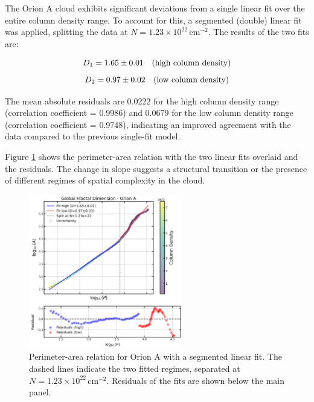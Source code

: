 The Orion A cloud exhibits significant deviations from a single linear fit over the entire column density range. To account for this, a segmented (double) linear fit was applied, splitting the data at $N = 1.23 \times 10^{22}\,\mathrm{cm}^{-2}$. The results of the two fits are:

\begin{equation}
    \notag
    D_1 = 1.65 \pm 0.01 \quad \text{(high column density)}
\end{equation}
\begin{equation}
    \notag
    D_2 = 0.97 \pm 0.02 \quad \text{(low column density)}
\end{equation}

The mean absolute residuals are 0.0222 for the high column density range (correlation coefficient = 0.9986) and 0.0679 for the low column density range (correlation coefficient = 0.9748), indicating an improved agreement with the data compared to the previous single-fit model.

Figure \ref{fig:orion_A_global_double_fit} shows the perimeter-area relation with the two linear fits overlaid and the residuals. The change in slope suggests a structural transition or the presence of different regimes of spatial complexity in the cloud.
\begin{figure}[t]
    \centering
    \includegraphics[width=0.6\textwidth]{figures/orion_A_global_double_fit.png}
    \caption{Perimeter-area relation for Orion A with a segmented linear fit. The dashed lines indicate the two fitted regimes, separated at $N=1.23 \times 10^{22}\,\mathrm{cm}^{-2}$. Residuals of the fits are shown below the main panel.}
    \label{fig:orion_A_global_double_fit}
\end{figure}

